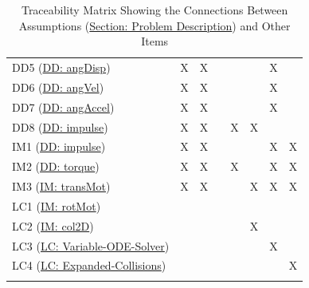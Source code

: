 \documentclass[12pt]{article}
\begin{document}
\begin{longtable}{l l l l l l l l}
DD5 (\hyperref[DD:angDisp]{DD: angDisp}) & X & X &  &  &  & X & 
\\
DD6 (\hyperref[DD:angVel]{DD: angVel}) & X & X &  &  &  & X & 
\\
DD7 (\hyperref[DD:angAccel]{DD: angAccel}) & X & X &  &  &  & X & 
\\
DD8 (\hyperref[DD:impulse]{DD: impulse}) & X & X &  & X & X &  & 
\\
IM1 (\hyperref[DD:impulse]{DD: impulse}) & X & X &  &  &  & X & X
\\
IM2 (\hyperref[DD:torque]{DD: torque}) & X & X &  & X &  & X & X
\\
IM3 (\hyperref[IM:transMot]{IM: transMot}) & X & X &  &  & X & X & X
\\
LC1 (\hyperref[IM:rotMot]{IM: rotMot}) &  &  &  &  &  &  & 
\\
LC2 (\hyperref[IM:col2D]{IM: col2D}) &  &  &  &  & X &  & 
\\
LC3 (\hyperref[lcVODES]{LC: Variable-ODE-Solver}) &  &  &  &  &  & X & 
\\
LC4 (\hyperref[lcEC]{LC: Expanded-Collisions}) &  &  &  &  &  &  & X
\\
\bottomrule
\caption{Traceability Matrix Showing the Connections Between Assumptions (\hyperref[Sec:ProbDesc]{Section: Problem Description}) and Other Items}
\label{Table:TraceyAssumpsOther}
\end{longtable}
\end{document}
